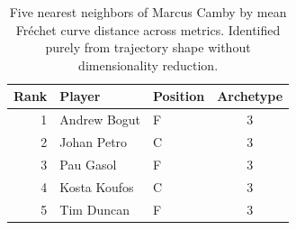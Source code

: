 \begin{table}[htbp]
  \centering\small
  \begin{tabular}{rllc}
    \toprule
    Rank & Player & Position & Archetype \\
    \midrule
    1 & Andrew Bogut & F & 3 \\
    2 & Johan Petro & C & 3 \\
    3 & Pau Gasol & F & 3 \\
    4 & Kosta Koufos & C & 3 \\
    5 & Tim Duncan & F & 3 \\
    \bottomrule
  \end{tabular}
  \caption{Five nearest neighbors of Marcus Camby by mean Fr\'{e}chet curve distance across metrics. Identified purely from trajectory shape without dimensionality reduction.}
  \label{tab:Marcus_Camby_frechet_curve_neighbors}
\end{table}

